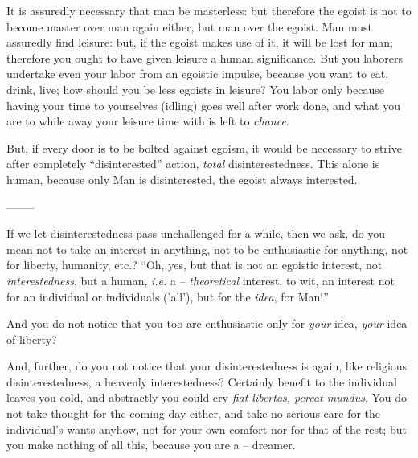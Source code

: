 \documentclass[12pt,a4paper]{book}
\begin{document}
It is assuredly necessary that man be masterless: but therefore the egoist is 
not to become master over man again either, but man over the egoist. Man must 
assuredly find leisure: but, if the egoist makes use of it, it will be lost 
for man; therefore you ought to have given leisure a human significance. But 
you laborers undertake even your labor from an egoistic impulse, because you 
want to eat, drink, live; how should you be less egoists in leisure? You labor 
only because having your time to yourselves (idling) goes well after work 
done, and what you are to while away your leisure time with is left to 
\textit{chance}.

But, if every door is to be bolted against egoism, it would be necessary to 
strive after completely ``disinterested'' action, \textit{total} 
disinterestedness. This alone is human, because only Man is disinterested, the 
egoist always interested.

\begin{center}
--------\end{center}


If we let disinterestedness pass unchallenged for a while, then we ask, do you 
mean not to take an interest in anything, not to be enthusiastic for anything, 
not for liberty, humanity, etc.? ``Oh, yes, but that is not an egoistic 
interest, not \textit{interestedness}, but a human, \textit{i.e.} a -- 
\textit{theoretical} interest, to wit, an interest not for an individual or 
individuals ('all'), but for the \textit{idea}, for Man!''

And you do not notice that you too are enthusiastic only for \textit{your} 
idea, \textit{your} idea of liberty?

And, further, do you not notice that your disinterestedness is again, like 
religious disinterestedness, a heavenly interestedness? Certainly benefit to 
the individual leaves you cold, and abstractly you could cry \textit{fiat 
libertas, pereat mundus}. You do not take thought for the coming day either, 
and take no serious care for the individual's wants anyhow, not for your own 
comfort nor for that of the rest; but you make nothing of all this, because 
you are a -- dreamer.
\end{document}
